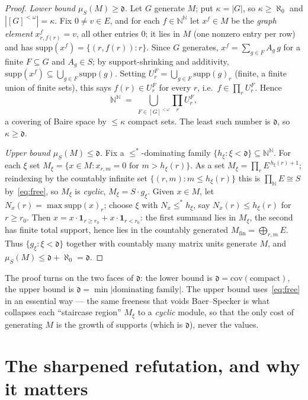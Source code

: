 \documentclass[11pt]{report}
\theoremstyle{plain}
\theoremstyle{definition}
\theoremstyle{remark}
\newcommand{\dd}{\mathfrak{d}}
\newcommand{\supp}{\mathrm{supp}}
\newcommand{\N}{\mathbb{N}}
\begin{document}
\begin{proof}
\emph{Lower bound $\mu_S(M)\ge\dd$.} Let $G$ generate $M$; put $\kappa=|G|$, so
$\kappa\ge\aleph_0$ and $|[G]^{<\omega}|=\kappa$. Fix $0\ne v\in E$, and for each
$f\in\N^\N$ let $x^f\in M$ be the \emph{graph element} $x^f_{r,f(r)}=v$, all other
entries $0$; it lies in $M$ (one nonzero entry per row) and has
$\supp(x^f)=\{(r,f(r)):r\}$. Since $G$ generates, $x^f=\sum_{g\in
F}A_g\,g$ for a finite $F\subseteq G$ and $A_g\in S$; by support-shrinking and
additivity, $\supp(x^f)\subseteq\bigcup_{g\in F}\supp(g)$. Setting
$U^F_r=\bigcup_{g\in F}\supp(g)_r$ (finite, a finite union of finite sets), this
says $f(r)\in U^F_r$ for every $r$, i.e.\ $f\in\prod_r U^F_r$. Hence
\[
   \N^\N \;=\; \bigcup_{F\in[G]^{<\omega}} \prod_r U^F_r ,
\]
a covering of Baire space by $\le\kappa$ compact sets. The least such number is
$\dd$, so $\kappa\ge\dd$.

\emph{Upper bound $\mu_S(M)\le\dd$.} Fix a $\le^*$-dominating family
$\{h_\xi:\xi<\dd\}\subseteq\N^\N$. For each $\xi$ set
$M_\xi=\{x\in M: x_{r,m}=0\text{ for } m>h_\xi(r)\}$. As a set
$M_\xi=\prod_r E^{\,h_\xi(r)+1}$; reindexing by the countably infinite set
$\{(r,m):m\le h_\xi(r)\}$ this is $\prod_\N E\cong S$ by~\eqref{eq:free}, so
$M_\xi$ is \emph{cyclic}, $M_\xi=S\cdot g_\xi$. Given $x\in M$, let
$N_x(r)=\max\supp(x)_r$; choose $\xi$ with $N_x\le^* h_\xi$, say $N_x(r)\le
h_\xi(r)$ for $r\ge r_0$. Then $x=x\cdot\mathbf 1_{r\ge r_0}+x\cdot\mathbf
1_{r<r_0}$: the first summand lies in $M_\xi$, the second has finite total
support, hence lies in the countably generated $M_{\mathrm{fin}}=\bigoplus_{r,m}E$.
Thus $\{g_\xi:\xi<\dd\}$ together with countably many matrix units generate $M$,
and $\mu_S(M)\le\dd+\aleph_0=\dd$.
\end{proof}

The proof turns on the two faces of $\dd$: the lower bound is
$\dd=\mathrm{cov}(\text{compact})$, the upper bound is $\dd=\min|\text{dominating
family}|$. The upper bound uses~\eqref{eq:free} in an essential way --- the same
freeness that voids Baer--Specker is what collapses each ``staircase region''
$M_\xi$ to a \emph{cyclic} module, so that the only cost of generating $M$ is the
growth of supports (which is $\dd$), never the values.

\section{The sharpened refutation, and why it matters}\label{sec:frontier-refute}
\end{document}

